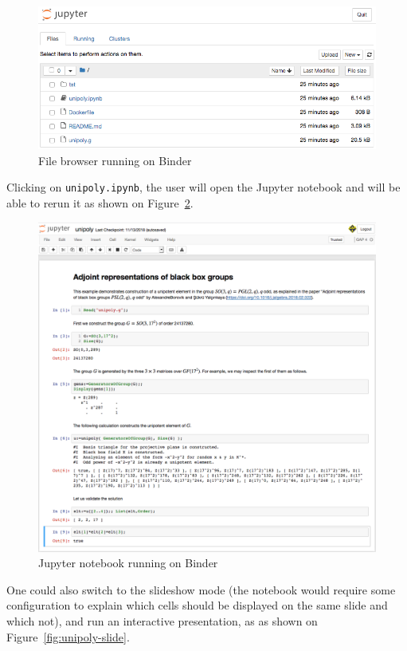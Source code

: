 \begin{figure}[!ht]
    \centering
    \includegraphics[width=\textwidth]{images/unipoly-files}
    \caption{File browser running on Binder}
    \label{fig:unipoly-files}
\end{figure}

Clicking on {\tt unipoly.ipynb}, the user will open the Jupyter notebook
and will be able to rerun it as shown on Figure~\ref{fig:unipoly-notebook}.

\begin{figure}[!ht]
    \centering
    \includegraphics[width=\textwidth]{images/unipoly-notebook}
    \caption{Jupyter notebook running on Binder}
    \label{fig:unipoly-notebook}
\end{figure}

One could also switch to the slideshow mode (the notebook would require
some configuration to explain which cells should be displayed on the
same slide and which not), and run an interactive presentation, as
as shown on Figure~\ref{fig:unipoly-slide}.

